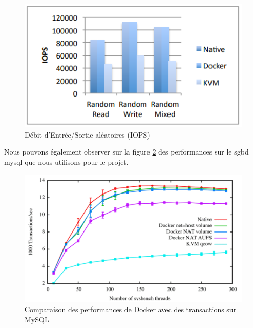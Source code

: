 \documentclass[
    iai, %
    il, %
]{heig-tb}
\begin{document}
\begin{center}
    \begin{figure}[H]
        \includegraphics[width=\textwidth]{./assets/figures/docker-perf-random-io.png}
        \caption[Débit d'I/O aléatoires]{Débit d'Entrée/Sortie aléatoires (IOPS) \cite{rad2017introduction} \label{random-io}}
    \end{figure}
\end{center}

Nous pouvons également observer sur la figure \ref{docker-perf-mysql} des performances sur le \Gls{sgbd} \Gls{mysql}
que nous utilisons pour le projet.

\begin{center}
    \begin{figure}[H]
        \includegraphics[width=\textwidth]{./assets/figures/docker-perf-mysql.png}
        \caption[Comparaison des perf. Docker sur MySQ]{Comparaison des performances de Docker avec des transactions sur MySQL \cite{felter} \label{docker-perf-mysql}}
    \end{figure}
\end{center}
\end{document}
